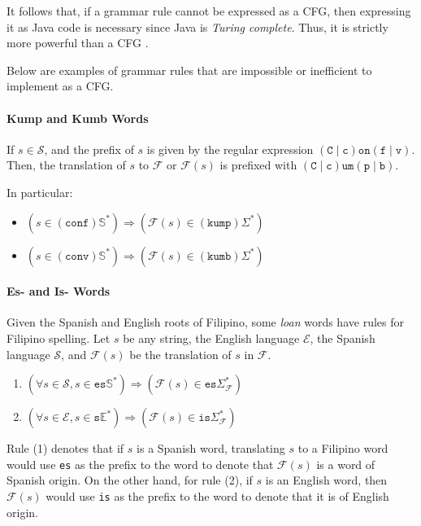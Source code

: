 It follows that, if a grammar rule cannot be expressed as a CFG, then expressing it as Java code is necessary since Java is \textit{Turing complete}. Thus, it is strictly more powerful than a CFG \cite{church_turing}.

Below are examples of grammar rules that are impossible or inefficient to implement as a CFG.

\paragraph{Kump and Kumb Words} If \(s\in \mathcal{S}\), and the prefix of \(s\) is given by the regular expression \((\texttt{C}\mid\texttt{c})\texttt{on}(\texttt{f}\mid\texttt{v})\). Then, the translation of $s$ to $\mathcal{F}$ or \(\mathcal{F}(s)\) is prefixed with \((\texttt{C}\mid\texttt{c})\texttt{um}(\texttt{p}\mid\texttt{b})\).

In particular:
\begin{itemize}
      \item \(\left(s \in (\texttt{conf})\mathbb{S}^*\right) \Longrightarrow \left(\mathcal{F}(s) \in (\texttt{kump})\Sigma^*\right)\)
      \item \(\left(s \in (\texttt{conv})\mathbb{S}^*\right) \Longrightarrow \left(\mathcal{F}(s) \in (\texttt{kumb})\Sigma^*\right)\)
\end{itemize}

\paragraph{Es- and Is- Words} Given the Spanish and English roots of Filipino, some \textit{loan} words have rules for Filipino spelling. Let \(s\) be any string, the English language \(\mathcal{E}\), the Spanish language \(\mathcal{S}\), and \(\mathcal{F}(s)\) be the translation of \(s\) in \(\mathcal{F}\).

\begin{enumerate}
      \item \(\left(\forall s\in \mathcal{S},s \in \texttt{es}\mathbb{S}^*\right) \Longrightarrow \left(\mathcal{F}(s) \in \texttt{es}\Sigma_\mathcal{F}^*\right) \)
      \item \(\left(\forall s\in \mathcal{E},s \in \texttt{s}\mathbb{E}^*\right) \Longrightarrow  \left(\mathcal{F}(s) \in \texttt{is} \Sigma_\mathcal{F}^* \right)\)
\end{enumerate}

Rule (1) denotes that if \(s\) is a Spanish word, translating \(s\) to a Filipino word would use \texttt{es} as the prefix to the word to denote that \(\mathcal{F}(s)\) is a word of Spanish origin. On the other hand, for rule (2), if \(s\) is an English word, then \(\mathcal{F}(s)\) would use \texttt{is} as the prefix to the word to denote that it is of English origin.

